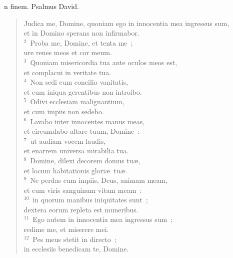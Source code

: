 \bchapter
{}n finem. Psalmus David. \begin{flushleft}\begin{verse}\vspace{6pt}Judica me, Domine, quoniam ego in innocentia mea ingressus sum,\\ et in Domino sperans non infirmabor.\\
${}^{2}$~Proba me, Domine, et tenta me~;\\ ure renes meos et cor meum.\\
${}^{3}$~Quoniam misericordia tua ante oculos meos est,\\ et complacui in veritate tua.\\
${}^{4}$~Non sedi cum concilio vanitatis,\\ et cum iniqua gerentibus non introibo.\\
${}^{5}$~Odivi ecclesiam malignantium,\\ et cum impiis non sedebo.\\
${}^{6}$~Lavabo inter innocentes manus meas,\\ et circumdabo altare tuum, Domine~:\\
${}^{7}$~ut audiam vocem laudis,\\ et enarrem universa mirabilia tua.\\
${}^{8}$~Domine, dilexi decorem domus tu\ae ,\\ et locum habitationis glori\ae\ tu\ae .\\
${}^{9}$~Ne perdas cum impiis, Deus, animam meam,\\ et cum viris sanguinum vitam meam~:\\
${}^{10}$~in quorum manibus iniquitates sunt~;\\ dextera eorum repleta est muneribus.\\
${}^{11}$~Ego autem in innocentia mea ingressus sum~;\\ redime me, et miserere mei.\\
${}^{12}$~Pes meus stetit in directo~;\\ in ecclesiis benedicam te, Domine.\end{verse}\end{flushleft}



